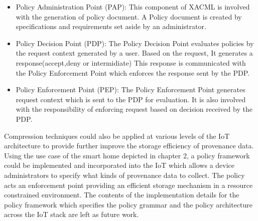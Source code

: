  
 \begin{itemize}
 
 \item Policy Administration Point (PAP): This component of XACML
is involved with the generation of policy document. A Policy document is created by specifications and requirements set aside by an administrator.

 \item Policy Decision Point (PDP): The Policy Decision Point evaluates policies by the request context generated by a user. Based on the request, It generates a response(accept,deny or intermidiate) This response is communicated with the Policy Enforcement Point which enforces the response sent by the PDP.


\item Policy Enforcement Point (PEP):  The Policy Enforcement Point generates request context which is sent to the PDP for evaluation. It is also involved with the responsibility of enforcing request based on decision received by the PDP.

 \end{itemize}


\par Compression techniques could also be applied at various levels of the IoT architecture to provide further improve the storage efficiency of provenance data. Using the use case of the smart home depicted in chapter 2, a policy framework could be implemented and incorporated into the IoT which allows a device administrators to specify what kinds of provenance data to collect. The policy acts an enforcement point providing an efficient storage mechanism in a resource constrained environment. The contents of the implementation details for the policy framework which specifies the policy grammar and the policy architecture across the IoT stack are left as future work.






%

